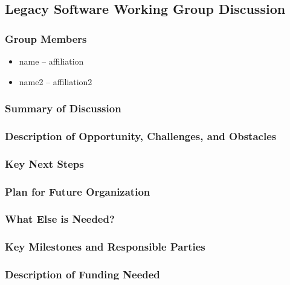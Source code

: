 \subsection{Legacy Software Working Group Discussion}
\label{sec:appendix_legacy_SW}


\subsubsection{Group Members}

\begin{itemize}
\item name -- affiliation
\item name2 -- affiliation2
\end{itemize}

\subsubsection{Summary of Discussion}

\subsubsection{Description of Opportunity, Challenges, and Obstacles}


\subsubsection{Key Next Steps}


\subsubsection{Plan for Future Organization}


\subsubsection{What Else is Needed?}


\subsubsection{Key Milestones and Responsible Parties}


\subsubsection{Description of Funding Needed}
